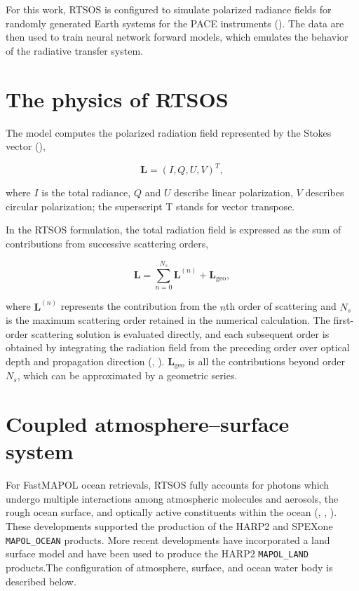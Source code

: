 \documentclass[
  11pt,
  letterpaper,
]{scrreprt}
\begin{document}
For this work, RTSOS is configured to simulate polarized radiance fields
for randomly generated Earth systems for the PACE instruments
(). The data are then used
to train neural network forward models, which emulates the behavior of
the radiative transfer system.

\section{The physics of RTSOS}\label{the-physics-of-rtsos}

The model computes the polarized radiation field represented by the
Stokes vector (),

\[
\mathbf{L}=(I,Q,U,V)^T,
\]

where \(I\) is the total radiance, \(Q\) and \(U\) describe linear
polarization, \(V\) describes circular polarization; the superscript T
stands for vector transpose.

In the RTSOS formulation, the total radiation field is expressed as the
sum of contributions from successive scattering orders,

\[
\mathbf{L} = \sum_{n=0}^{N_s}\mathbf{L}^{(n)} + \mathbf{L}_{\mathrm{geo}},
\]

where \(\mathbf{L}^{(n)}\) represents the contribution from the \(n\)th
order of scattering and \(N_s\) is the maximum scattering order retained
in the numerical calculation. The first-order scattering solution is
evaluated directly, and each subsequent order is obtained by integrating
the radiation field from the preceding order over optical depth and
propagation direction (,
). \(\mathbf{L}_{\mathrm{geo}}\) is all
the contributions beyond order \(N_s\), which can be approximated by a
geometric series.

\section{Coupled atmosphere--surface
system}\label{coupled-atmospheresurface-system}

For FastMAPOL ocean retrievals, RTSOS fully accounts for photons which
undergo multiple interactions among atmospheric molecules and aerosols,
the rough ocean surface, and optically active constituents within the
ocean (,
, ).
These developments supported the production of the HARP2 and SPEXone
\texttt{MAPOL\_OCEAN} products. More recent developments have
incorporated a land surface model and have been used to produce the
HARP2 \texttt{MAPOL\_LAND} products.The configuration of atmosphere,
surface, and ocean water body is described below.
\end{document}
